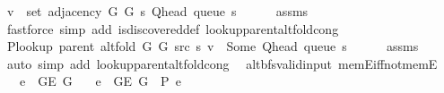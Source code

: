 \begin{isabellebody}
\ {\isachardoublequoteopen}v\ {\isasymin}\ set\ {\isacharparenleft}{\kern0pt}adjacency\ G{}\ G{}\ s\ {\isacharparenleft}{\kern0pt}Q{\isacharunderscore}{\kern0pt}head\ {\isacharparenleft}{\kern0pt}queue\ s{\isacharparenright}{\kern0pt}{\isacharparenright}{\kern0pt}{\isacharparenright}{\kern0pt}{\isachardoublequoteclose}\isanewline
\ \ \ \ \isamarkupfalse%
\ assms\isanewline
\ \ \ \ \isamarkupfalse%
\ {\isacharparenleft}{\kern0pt}fastforce\ simp\ add{\isacharcolon}{\kern0pt}\ is{\isacharunderscore}{\kern0pt}discovered{\isacharunderscore}{\kern0pt}def\ lookup{\isacharunderscore}{\kern0pt}parent{\isacharunderscore}{\kern0pt}alt{\isacharunderscore}{\kern0pt}fold{\isacharunderscore}{\kern0pt}cong{\isacharparenright}{\kern0pt}\isanewline
\ \ \isamarkupfalse%
\ {\isachardoublequoteopen}P{\isacharunderscore}{\kern0pt}lookup\ {\isacharparenleft}{\kern0pt}parent\ {\isacharparenleft}{\kern0pt}alt{\isacharunderscore}{\kern0pt}fold\ G{}\ G{}\ src\ s{\isacharparenright}{\kern0pt}{\isacharparenright}{\kern0pt}\ v\ {\isacharequal}{\kern0pt}\ Some\ {\isacharparenleft}{\kern0pt}Q{\isacharunderscore}{\kern0pt}head\ {\isacharparenleft}{\kern0pt}queue\ s{\isacharparenright}{\kern0pt}{\isacharparenright}{\kern0pt}{\isachardoublequoteclose}\isanewline
\ \ \ \ \isamarkupfalse%
\ assms\isanewline
\ \ \ \ \isamarkupfalse%
\ {\isacharparenleft}{\kern0pt}auto\ simp\ add{\isacharcolon}{\kern0pt}\ lookup{\isacharunderscore}{\kern0pt}parent{\isacharunderscore}{\kern0pt}alt{\isacharunderscore}{\kern0pt}fold{\isacharunderscore}{\kern0pt}cong{\isacharparenright}{\kern0pt}\isanewline
{}\isamarkupfalse%
%
\endisatagproof
{\isafoldproof}%
%
\isadelimproof
\isanewline
%
\endisadelimproof
%
\isadeliminvisible
\isanewline
%
\endisadeliminvisible
%
\isataginvisible
{}\isamarkupfalse%
\ {\isacharparenleft}{\kern0pt}\ alt{\isacharunderscore}{\kern0pt}bfs{\isacharunderscore}{\kern0pt}valid{\isacharunderscore}{\kern0pt}input{\isacharparenright}{\kern0pt}\ mem{\isacharunderscore}{\kern0pt}E{}{\isacharunderscore}{\kern0pt}iff{\isacharunderscore}{\kern0pt}not{\isacharunderscore}{\kern0pt}mem{\isacharunderscore}{\kern0pt}E{}{\isacharcolon}{\kern0pt}\isanewline
\ \ \ {\isachardoublequoteopen}e\ {\isasymin}\ G{\isachardot}{\kern0pt}E\ G{\isachardoublequoteclose}\isanewline
\ \ \ {\isachardoublequoteopen}e\ {\isasymnotin}\ G{\isachardot}{\kern0pt}E\ G{}\ {\isacharequal}{\kern0pt}\ P{\isacharprime}{\kern0pt}{\isacharprime}{\kern0pt}\ e{\isachardoublequoteclose}%

\end{isabellebody}
